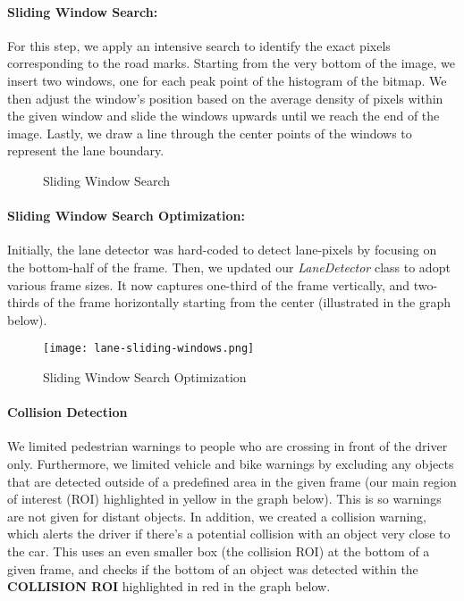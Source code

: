 \paragraph{Sliding Window Search: } For this step, we apply an intensive search to identify the exact pixels corresponding to the road marks. Starting from the very bottom of the image, we insert two windows, one for each peak point of the histogram of the bitmap. We then adjust the window's position based on the average density of pixels within the given window and slide the windows upwards until we reach the end of the image. Lastly, we draw a line through the center points of the windows to represent the lane boundary.

\begin{figure}[h!]
  \centering
  \qquad
  \qquad
  \caption{Sliding Window Search}
\end{figure}

\pagebreak

\paragraph{Sliding Window Search Optimization: } Initially, the lane detector was hard-coded to detect lane-pixels by focusing on the bottom-half of the frame. Then, we updated our \textit{LaneDetector} class to adopt various frame sizes. It now captures one-third of the frame vertically, and two-thirds of the frame horizontally starting from the center (illustrated in the graph below). 

\begin{figure}[h!]
	\centering
    \texttt{[image: lane-sliding-windows.png]}
    \caption{Sliding Window Search Optimization}
\end{figure}

\pagebreak

\paragraph{Collision Detection} We limited pedestrian warnings to people who are crossing in front of the driver only. Furthermore, we limited vehicle and bike warnings by excluding any objects that are detected outside of a predefined area in the given frame (our main region of interest (ROI) highlighted in yellow in the graph below). This is so warnings are not given for distant objects.  In addition, we created a collision warning, which alerts the driver if there’s a potential collision with an object very close to the car. This uses an even smaller box (the collision ROI) at the bottom of a given frame, and checks if the bottom of an object was detected within the \textbf{COLLISION ROI} highlighted in red in the graph below.

